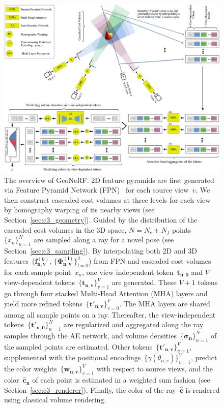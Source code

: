 \begin{figure}[!t]
    \begin{center}
        \includegraphics[width=1.0\linewidth]{images/chapter3/figures/GeoNeRF.jpg}
    \end{center}
   \caption{The overview of GeoNeRF. 2D feature pyramids are first generated via Feature Pyramid Network (FPN)~\cite{lin2017feature} for each source view~$v$. We then construct cascaded cost volumes at three levels for each view by homography warping of its nearby views (see Section~\ref{sec:c3_geometry}). Guided by the distribution of the cascaded cost volumes in the 3D space, $N=N_{c}+N_{f}$ points~$\{x_{n}\}_{n=1}^{N}$ are sampled along a ray for a novel pose (see Section~\ref{sec:c3_sampling}). By interpolating both 2D and 3D features~($\boldsymbol{f_{n,v}^{(0)}}$, $\{\boldsymbol{\Phi_{n,v}^{(l)}}\}_{l=0}^{2}$) from FPN and cascaded cost volumes for each sample point~$x_{n}$, one view independent token~$\boldsymbol{t_{n,0}}$ and $V$ view-dependent tokens~$\{\boldsymbol{t_{n,v}}\}_{v=1}^{V}$ are generated. These $V+1$ tokens go through four stacked Multi-Head Attention (MHA) layers and yield more refined tokens~$\{\boldsymbol{t'_{n,v}}\}_{v=0}^{V}$. The MHA layers are shared among all sample points on a ray. Thereafter, the view-independent tokens~$\{\boldsymbol{t'_{n,0}}\}_{n=1}^{N}$ are regularized and aggregated along the ray samples through the AE network, and volume densities~$\{\boldsymbol{\sigma_{n}}\}_{n=1}^{N}$ of the sampled points are estimated. Other tokens~$\{\boldsymbol{t'_{n,v}}\}_{v=1}^{V}$, supplemented with the positional encodings~$\{\gamma(\theta_{n,v})\}_{v=1}^{V}$, predict the color weights~$\{\boldsymbol{w_{n,v}}\}_{v=1}^{V}$ with respect to source views, and the color~$\boldsymbol{\hat{c}_{n}}$ of each point is estimated in a weighted sum fashion (see Section~\ref{sec:c3_renderer}). Finally, the color of the ray~$\boldsymbol{\hat{c}}$ is rendered using classical volume rendering.}
    \label{fig:c3_arch}
\end{figure}

